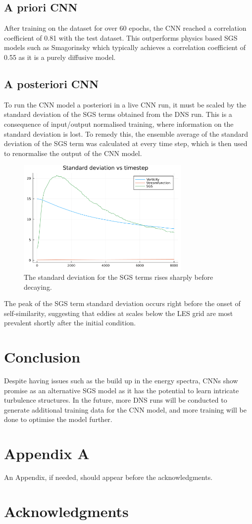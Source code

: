 \documentclass[conf]{new-aiaa}
\begin{document}
\subsection{A priori CNN}
After training on the dataset for over 60 epochs, the CNN reached a correlation coefficient of 0.81 with the test dataset. This outperforms physics based SGS models such as Smagorinsky \cite{2022_LES_CNN,pawar2020priori} which typically achieves a correlation coefficient of 0.55 as it is a purely diffusive model.
\pagebreak
\subsection{A posteriori CNN}
To run the CNN model a posteriori in a live CNN run, it must be scaled by the standard deviation of the SGS terms obtained from the DNS run. This is a consequence of input/output normalised training, where information on the standard deviation is lost. To remedy this, the ensemble average of the standard deviation of the SGS term was calculated at every time step, which is then used to renormalise the output of the CNN model.
\begin{figure}[h]
    \centering
    \includegraphics[width=0.75\textwidth]{STDs.png}
    \caption{The standard deviation for the SGS terms rises sharply before decaying.}
\end{figure}
The peak of the SGS term standard deviation occurs right before the onset of self-similarity, suggesting that eddies at scales below the LES grid are most prevalent shortly after the initial condition.

\pagebreak
\section{Conclusion}
Despite having issues such as the build up in the energy spectra, CNNs show
promise as an alternative SGS model as it has the potential to learn intricate
turbulence structures. In the future, more DNS runs will be conducted to
generate additional training data for the CNN model, and more training will be
done to optimise the model further.

\section*{Appendix A}
\label{appendix:A}

An Appendix, if needed, should appear before the acknowledgments.

\section*{Acknowledgments}


\end{document}
